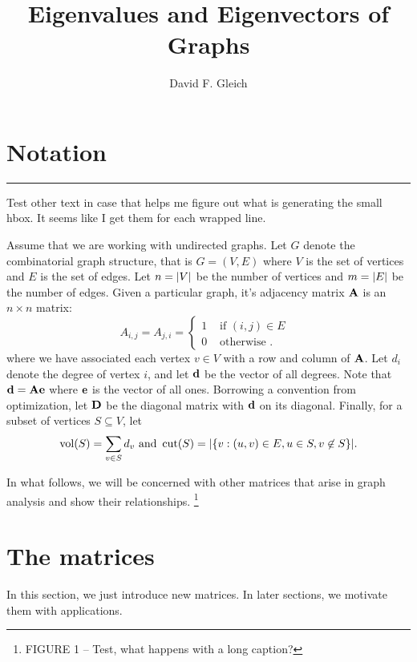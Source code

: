 \documentclass[nofonts]{dgleich-article}
\title{Eigenvalues and Eigenvectors of Graphs}
\author{David F. Gleich}
\DeclareMathOperator{\vol}{vol}
\DeclareMathOperator{\cut}{cut}
\begin{document}
\maketitle

\section{Notation}

\begin{marginfigure}
\centering
\rule{1in}{1in}

\caption{Test other text in case that helps me figure out what is generating
the small hbox.  It seems like I get them for each wrapped line.}
\end{marginfigure}


Assume that we are working with undirected graphs. Let $G$
denote the combinatorial graph structure, that is $G = (V,E)$ 
where $V$ is the set of vertices and $E$ is the set of edges.
Let $n = \lvert V\rvert$ be the number of vertices and $m = \lvert E\rvert$
be the number of edges. 
Given a particular graph, it's adjacency matrix $\boldsymbol{\mathrm{A}}$
is an $n \times n$ matrix:
\[ A_{i,j} = A_{j,i} = \begin{cases} 1 & \text{ if $(i,j) \in E$ } \\
                                     0 & \text{ otherwise }.
                       \end{cases}
\]
where we have associated each vertex $v \in V$ with a row and
column of $\boldsymbol{\mathrm{A}}$.  Let $d_i$ denote the degree of vertex $i$, and
let $\boldsymbol{\mathrm{d}}$ be the vector of all degrees.  Note that $\boldsymbol{\mathrm{d}} = \boldsymbol{\mathrm{A}} \boldsymbol{\mathrm{e}}$
where $\boldsymbol{\mathrm{e}}$ is the vector of all ones.  Borrowing a convention
from optimization, let $\boldsymbol{\mathrm{D}}$ be the diagonal matrix with $\boldsymbol{\mathrm{d}}$
on its diagonal.  Finally, for a subset of vertices $S \subseteq V$, let 
\[ \vol(S) = \sum_{v \in S} d_v \text{ and } 
    \cut(S) = \cardof*{ \BraceOf{ v : (u,v) \in E, u \in S, v \not\in S} }.
\]

In what follows, we will be concerned with other matrices that arise
in graph analysis and show their relationships. \footnote{FIGURE 1 -- Test, what happens with a long caption?}

\section{The matrices}

In this section, we just introduce new matrices.  In later sections, we motivate
them with applications.
\end{document}
